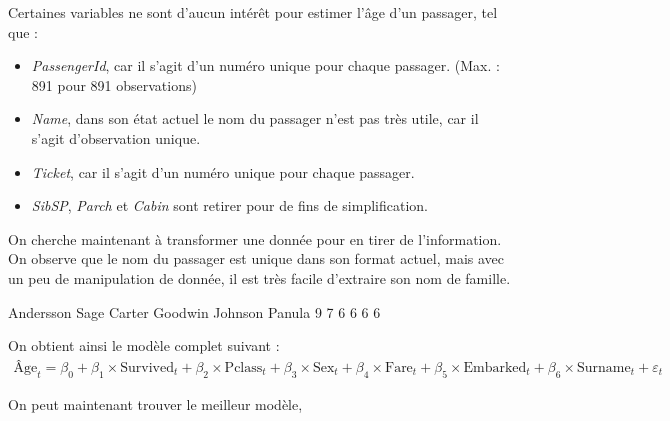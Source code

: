\documentclass[11pt,french]{report}
\begin{document}
\bigskip
Certaines variables ne sont d'aucun intérêt pour estimer l'âge d'un passager, tel que :
\begin{itemize}
\item \emph{PassengerId}, car il s'agit d'un numéro unique pour chaque passager. (Max. : 891 pour 891 observations)
\item \emph{Name}, dans son état actuel le nom du passager n'est pas très utile, car il s'agit d'observation unique.
\item \emph{Ticket}, car il s'agit d'un numéro unique pour chaque passager.
\item \emph{SibSP}, \emph{Parch} et \emph{Cabin} sont retirer pour de fins de simplification. 
\end{itemize}

\bigskip
On cherche maintenant à transformer une donnée pour en tirer de l'information. On observe que le nom du passager est unique dans son format actuel, mais avec un peu de manipulation de donnée, il est très facile d'extraire son nom de famille.


\begin{Schunk}
\begin{Soutput}
Andersson      Sage    Carter   Goodwin   Johnson    Panula 
        9         7         6         6         6         6 
\end{Soutput}
\end{Schunk}

On obtient ainsi le modèle complet suivant :
\begin{align*}
\text{Âge}_t = \beta_0 + \beta_1 \times \text{Survived}_t + \beta_2 \times \text{Pclass}_t + \beta_3  \times \text{Sex}_t + \beta_4  \times \text{Fare}_t + \beta_5  \times \text{Embarked}_t + \beta_6  \times \text{Surname}_t + \varepsilon_t
\end{align*}

On peut maintenant trouver le meilleur modèle,
\end{document}
